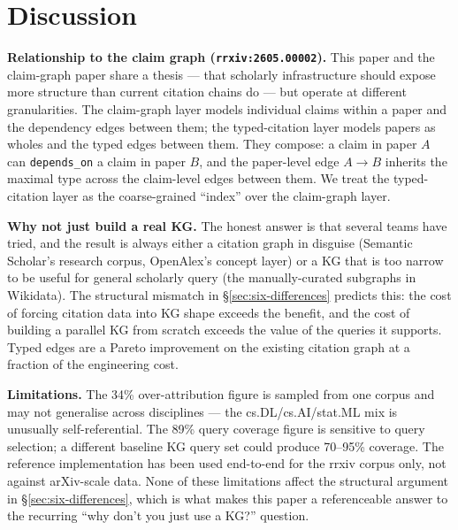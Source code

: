 \documentclass{rrxiv}
\begin{document}
\section{Discussion}\label{sec:discussion}

\textbf{Relationship to the claim graph (\texttt{rrxiv:2605.00002}).} This paper and the claim-graph paper share a thesis --- that scholarly infrastructure should expose more structure than current citation chains do --- but operate at different granularities. The claim-graph layer models individual claims within a paper and the dependency edges between them; the typed-citation layer models papers as wholes and the typed edges between them. They compose: a claim in paper $A$ can \texttt{depends\_on} a claim in paper $B$, and the paper-level edge $A \to B$ inherits the maximal type across the claim-level edges between them. We treat the typed-citation layer as the coarse-grained ``index'' over the claim-graph layer.

\textbf{Why not just build a real KG.} The honest answer is that several teams have tried, and the result is always either a citation graph in disguise (Semantic Scholar's research corpus, OpenAlex's concept layer) or a KG that is too narrow to be useful for general scholarly query (the manually-curated subgraphs in Wikidata). The structural mismatch in \S\ref{sec:six-differences} predicts this: the cost of forcing citation data into KG shape exceeds the benefit, and the cost of building a parallel KG from scratch exceeds the value of the queries it supports. Typed edges are a Pareto improvement on the existing citation graph at a fraction of the engineering cost.

\textbf{Limitations.} The 34\% over-attribution figure is sampled from one corpus and may not generalise across disciplines --- the cs.DL/cs.AI/stat.ML mix is unusually self-referential. The 89\% query coverage figure is sensitive to query selection; a different baseline KG query set could produce 70--95\% coverage. The reference implementation has been used end-to-end for the rrxiv corpus only, not against arXiv-scale data. None of these limitations affect the structural argument in \S\ref{sec:six-differences}, which is what makes this paper a referenceable answer to the recurring ``why don't you just use a KG?'' question.
\end{document}
